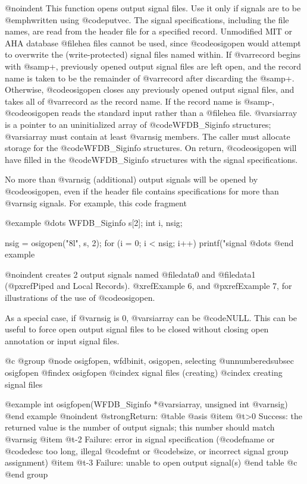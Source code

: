 {{{{{{{{{@noindent
This function opens output signal files.  Use it only if signals are to
be @emph{written} using @code{putvec}.  The signal specifications,
including the file names, are read from the header file for a
specified record.  Unmodified MIT or AHA database @file{hea} files
cannot be used, since @code{osigopen} would attempt to overwrite the
(write-protected) signal files named within.  If @var{record} begins
with @samp{+}, previously opened output signal files are left open, and
the record name is taken to be the remainder of @var{record} after
discarding the @samp{+}.  Otherwise, @code{osigopen} closes any
previously opened output signal files, and takes all of @var{record} as
the record name.  If the record name is @samp{-}, @code{osigopen} reads
the standard input rather than a @file{hea} file.  @var{siarray} is a
pointer to an uninitialized array of @code{WFDB_Siginfo} structures;
@var{siarray} must contain at least @var{nsig} members.  The caller must
allocate storage for the @code{WFDB_Siginfo} structures.  On return,
@code{osigopen} will have filled in the @code{WFDB_Siginfo} structures with
the signal specifications.

No more than @var{nsig} (additional) output signals will be opened by
@code{osigopen}, even if the header file contains specifications for
more than @var{nsig} signals.  For example, this code fragment

@example
@dots{}
WFDB_Siginfo s[2];
int i, nsig;

nsig = osigopen("8l", s, 2);
for (i = 0; i < nsig; i++)
    printf("signal %
@dots{}
@end example

@noindent
creates 2 output signals named @file{data0} and @file{data1}
(@pxref{Piped and Local Records}).  @xref{Example 6}, and @pxref{Example 7},
for illustrations of the use of @code{osigopen}.

As a special case, if @var{nsig} is 0, @var{siarray} can be @code{NULL}.
This can be useful to force open output signal files to be closed
without closing open annotation or input signal files.

@c @group
@node     osigfopen, wfdbinit, osigopen, selecting
@unnumberedsubsec osigfopen
@findex osigfopen
@cindex signal files (creating)
@cindex creating signal files

@example
int osigfopen(WFDB_Siginfo *@var{siarray}, unsigned int @var{nsig})
@end example
@noindent
@strong{Return:}
@table @asis
@item @t{>0}
Success: the returned value is the number of output signals;  this number
should match @var{nsig}
@item @t{-2}
Failure: error in signal specification (@code{fname} or @code{desc} too
long, illegal @code{fmt} or @code{bsize}, or incorrect signal group
assignment)
@item @t{-3}
Failure: unable to open output signal(s)
@end table
@c @end group

}}}}}}}}}
